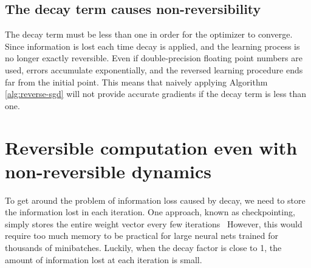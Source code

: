 \documentclass{article}
\begin{document}

\subsection{The decay term causes non-reversibility}
The decay term must be less than one in order for the optimizer to converge.
Since information is lost each time decay is applied, and the learning process is no longer exactly reversible.
Even if double-precision floating point numbers are used, errors accumulate exponentially, and the reversed learning procedure ends far from the initial point.
This means that naively applying Algorithm \ref{alg:reverse-sgd} will not provide accurate gradients if the decay term is less than one.

\section{Reversible computation even with non-reversible dynamics}
\label{sec:reversible computation}
To get around the problem of information loss caused by decay, we need to store the information lost in each iteration.
One approach, known as checkpointing, simply stores the entire weight vector every few iterations~\citep{martens2012training}
However, this would require too much memory to be practical for large neural nets trained for thousands of minibatches.
Luckily, when the decay factor is close to 1, the amount of information lost at each iteration is small.
\end{document}
